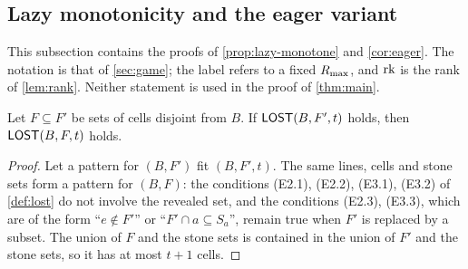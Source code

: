 
\subsection{Lazy monotonicity and the eager variant}\label{sec:extra-lazy}

This subsection contains the proofs of \cref{prop:lazy-monotone} and
\cref{cor:eager}. The notation is that of \cref{sec:game}; the label \WON{} refers to a fixed
$R_{\max}$, and $\operatorname{rk}$ is the rank of \cref{lem:rank}. Neither statement is used in the proof of
\cref{thm:main}.

\begin{lemma}\label{lem:lost-antitone}
Let $F\subseteq F'$ be sets of cells disjoint from $B$. If $\mathsf{LOST}(B,F',t)$ holds, then $\mathsf{LOST}(B,F,t)$ holds.
\end{lemma}

\begin{proof}
Let a pattern for $(B,F')$ fit $(B,F',t)$. The same lines, cells and stone sets form a pattern for $(B,F)$:
the conditions (E2.1), (E2.2), (E3.1), (E3.2) of \cref{def:lost} do not involve the revealed set,
and the conditions (E2.3), (E3.3), which are of the form ``$e\notin F'$'' or ``$F'\cap a\subseteq S_a$'', remain
true when $F'$ is replaced by a subset. The union of $F$ and the stone sets is contained in the union of
$F'$ and the stone sets, so it has at most $t+1$ cells.
\end{proof}

